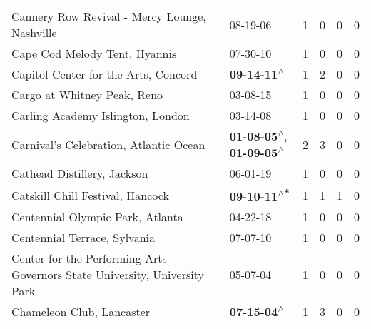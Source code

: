 \begin{supertabular}{p{0.4\textwidth}p{0.3\textwidth}p{0.05\textwidth}p{0.05\textwidth}p{0.05\textwidth}p{0.05\textwidth}}
                                Cannery Row Revival - Mercy Lounge, Nashville &                                                                  08-19-06\textsuperscript{} &  1 &  0 &  0 &  0 \\
                                                Cape Cod Melody Tent, Hyannis &                                                                  07-30-10\textsuperscript{} &  1 &  0 &  0 &  0 \\
                                         Capitol Center for the Arts, Concord &                                                 \textbf{09-14-11\textsuperscript{$\wedge$}} &  1 &  2 &  0 &  0 \\
                                                  Cargo at Whitney Peak, Reno &                                                                  03-08-15\textsuperscript{} &  1 &  0 &  0 &  0 \\
                                            Carling Academy Islington, London &                                                                  03-14-08\textsuperscript{} &  1 &  0 &  0 &  0 \\
                                       Carnival's Celebration, Atlantic Ocean &    \textbf{01-08-05\textsuperscript{$\wedge$}}, \textbf{01-09-05\textsuperscript{$\wedge$}} &  2 &  3 &  0 &  0 \\
                                                  Cathead Distillery, Jackson &                                                                  06-01-19\textsuperscript{} &  1 &  0 &  0 &  0 \\
                                             Catskill Chill Festival, Hancock &                                                \textbf{09-10-11\textsuperscript{$\wedge$*}} &  1 &  1 &  1 &  0 \\
                                             Centennial Olympic Park, Atlanta &                                                                  04-22-18\textsuperscript{} &  1 &  0 &  0 &  0 \\
                                                 Centennial Terrace, Sylvania &                                                                  07-07-10\textsuperscript{} &  1 &  0 &  0 &  0 \\
 Center for the Performing Arts - Governors State University, University Park &                                                                  05-07-04\textsuperscript{} &  1 &  0 &  0 &  0 \\
                                                    Chameleon Club, Lancaster &                                                 \textbf{07-15-04\textsuperscript{$\wedge$}} &  1 &  3 &  0 &  0 \\

\end{supertabular}
